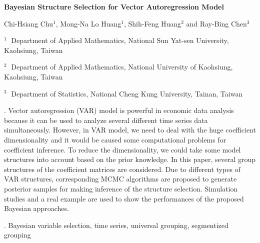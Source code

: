 \documentclass[12pt]{article}
\begin{document}
\begin{flushleft}


{\LARGE\bf Bayesian Structure Selection for Vector Autoregression
Model}


\vspace{1.0cm}

Chi-Hsiang Chu$^1$, Mong-Na Lo Huang$^1$, Shih-Feng Huang$^2$ and
Ray-Bing Chen$^3$

\begin{description}

\item $^1 \;$ Department of Applied Mathematics, National Sun Yat-sen University, Kaohsiung,
Taiwan

\item $^2 \;$ Department of Applied Mathematics, National University of Kaohsiung,
Kaohsiung, Taiwan

\item $^3 \;$ Department of Statistics, National Cheng Kung University, Tainan,
Taiwan

\end{description}

\end{flushleft}


\vspace{0.75cm}

. Vector autoregression (VAR) model is
powerful in economic data analysis because it can be used to analyze
several different time series data simultaneously. However, in VAR
model, we need to deal with the huge coefficient dimensionality and
it would be caused some computational problems for coefficient
inference. To reduce the dimensionality, we could take some model
structures into account based on the prior knowledge. In this paper,
several group structures of the coefficient matrices are considered.
Due to different types of VAR structures, corresponding MCMC
algorithms are proposed to generate posterior samples for making
inference of the structure selection. Simulation studies and a real
example are used to show the performances of the proposed Bayesian
approaches.

\vskip 2mm

. Bayesian variable selection, time series,
universal grouping, segmentized grouping
\end{document}
